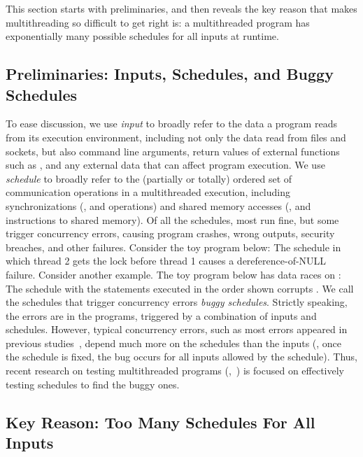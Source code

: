 This section starts with preliminaries, and then reveals the key reason that
makes multithreading so difficult to get right is: a multithreaded program has
exponentially many possible schedules for all inputs at runtime.

\subsection{Preliminaries: Inputs, Schedules, and Buggy Schedules}

To ease discussion, we use \emph{input} to broadly refer to the data a
program reads from its execution environment, including not only the data
read from files and sockets, but also command line arguments, return
values of external functions such as , and any external data
that can affect program execution.  We use \emph{schedule} to broadly refer to
the (partially or totally) ordered set of communication operations in a
multithreaded execution, including synchronizations (\eg,  and
 operations) and shared memory accesses (\eg,  and
 instructions to shared memory). Of all the schedules, most run
fine, but some trigger concurrency errors, causing program crashes,
wrong outputs, security breaches, and other failures. Consider the toy program
below:  \noindent The schedule in which thread 2
gets the lock before thread 1 causes a dereference-of-NULL failure.  Consider
another example.  The toy program below has data races on :
 \noindent The schedule with the statements
executed in the order shown corrupts . We call the schedules that
trigger concurrency errors \emph{buggy schedules}.  Strictly speaking, the
errors are in the programs, triggered by a combination of inputs and schedules. 
However, typical concurrency errors, such as most errors appeared in previous
studies~\cite{lu:concurrency-bugs,con:hotpar12}, depend much more on the
schedules than the inputs (\eg, once the schedule is fixed, the bug
occurs for all inputs allowed by the schedule).  Thus, recent research on
testing multithreaded programs (\eg,~\cite{musuvathi:chess:osdi08}) is
focused on effectively testing schedules to find the buggy ones.

\subsection{Key Reason: Too Many Schedules For All Inputs}

